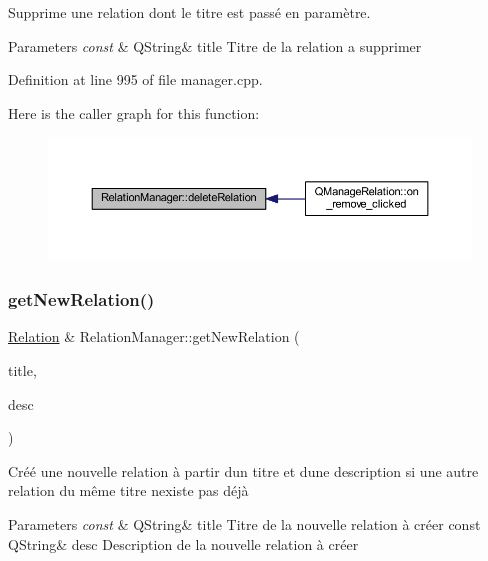 Supprime une relation dont le titre est passé en paramètre. 


\begin{DoxyParams}{Parameters}
{\em const} & Q\+String\& title Titre de la relation a supprimer \\
\hline
\end{DoxyParams}


Definition at line 995 of file manager.\+cpp.

Here is the caller graph for this function\+:\nopagebreak
\begin{figure}[H]
\begin{center}
\leavevmode
\includegraphics[width=350pt]{class_relation_manager_a074413b3ed72a1342821e911c1fa3587_icgraph}
\end{center}
\end{figure}
\mbox{\label{class_relation_manager_a1f9d556e0505105205e1fdb4905c4a80}} 
\subsubsection{\texorpdfstring{get\+New\+Relation()}{getNewRelation()}}
{\footnotesize\ttfamily \hyperlink{class_relation}{Relation} \& Relation\+Manager\+::get\+New\+Relation (\begin{DoxyParamCaption}\item[{const Q\+String \&}]{title,  }\item[{const Q\+String \&}]{desc }\end{DoxyParamCaption})}



Créé une nouvelle relation à partir d\textquotesingle{}un titre et d\textquotesingle{}une description si une autre relation du même titre n\textquotesingle{}existe pas déjà 


\begin{DoxyParams}{Parameters}
{\em const} & Q\+String\& title Titre de la nouvelle relation à créer const Q\+String\& desc Description de la nouvelle relation à créer \\
\hline
\end{DoxyParams}


